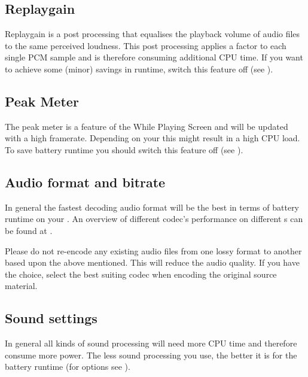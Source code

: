 \subsection{Replaygain}
  Replaygain is a post processing that equalises the playback volume of audio
  files to the same perceived loudness. This post processing applies a factor
  to each single PCM sample and is therefore consuming additional CPU time. If
  you want to achieve some (minor) savings in runtime, switch this feature off
  (see ).

\subsection{Peak Meter}
  The peak meter is a feature of the While Playing Screen and will be updated with a
  high framerate. Depending on your \dap{} this might result in a high CPU load. To
  save battery runtime you should switch this feature off (see ).

\subsection{Audio format and bitrate}
  In general the fastest decoding audio format will be the best in terms of
  battery runtime on your \dap{}. An overview of different codec's performance
  on different \dap{}s can be found at .


  Please do not re-encode any existing audio files from one lossy format to
  another based upon the above mentioned. This will reduce the audio quality.
  If you have the choice, select the best suiting codec when encoding the
  original source material.

\subsection{Sound settings}
  In general all kinds of sound processing will need more CPU time and therefore
  consume more power. The less sound processing you use, the better it is for
  the battery runtime (for options see ).
